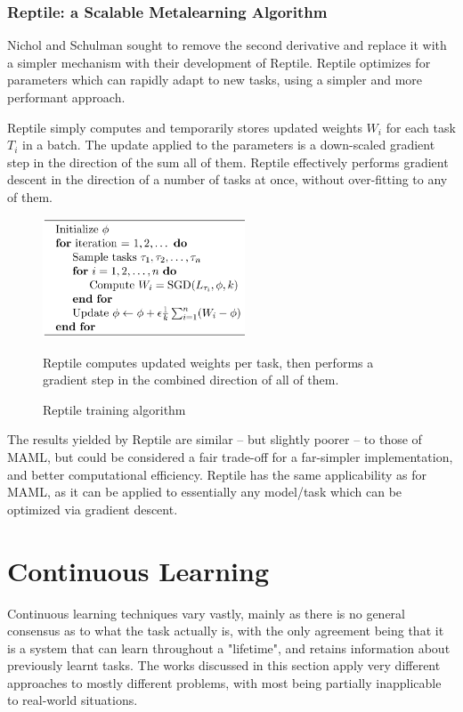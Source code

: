 \documentclass{report}
\begin{document}
	\subsubsection{Reptile: a Scalable Metalearning Algorithm}
	Nichol and Schulman \parencite{reptile} sought to remove the second derivative and replace it with a simpler mechanism with their development of Reptile. Reptile optimizes for parameters which can rapidly adapt to new tasks, using a simpler and more performant approach. \par
	Reptile simply computes and temporarily stores updated weights $W_i$ for each task $T_i$ in a batch. The update applied to the parameters is a down-scaled gradient step in the direction of the sum all of them. Reptile effectively performs gradient descent in the direction of a number of tasks at once, without over-fitting to any of them.
	\begin{figure}[h]
		\centering
		\includegraphics[width=6cm]{reptilealgo}
		\caption{Reptile training algorithm}
		Reptile computes updated weights per task, then performs a gradient step in the combined direction of all of them.
		\label{fig:reptile-algo:1}
	\end{figure}
	The results yielded by Reptile are similar -- but slightly poorer -- to those of MAML, but could be considered a fair trade-off for a far-simpler implementation, and better computational efficiency. Reptile has the same applicability as for MAML, as it can be applied to essentially any model/task which can be optimized via gradient descent.
	
	
	\section{Continuous Learning} \label{related-cont-learning:1}
	Continuous learning techniques vary vastly, mainly as there is no general consensus as to what the task actually is, with the only agreement being that it is a system that can learn throughout a "lifetime", and retains information about previously learnt tasks. The works discussed in this section apply very different approaches to mostly different problems, with most being partially inapplicable to real-world situations.
	
\end{document}
